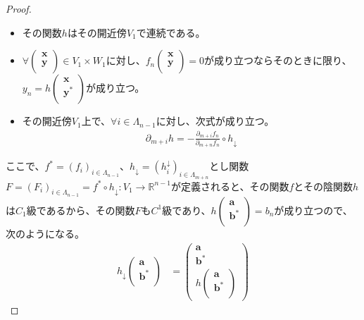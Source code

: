 \documentclass[dvipdfmx]{jsarticle}
\begin{document}
\begin{proof}
\begin{itemize}
\item
  その関数$h$はその開近傍$V_{1}$で連続である。
\item
  $\forall\begin{pmatrix}
  \mathbf{x} \\
  \mathbf{y} \\
  \end{pmatrix} \in V_{1} \times W_{1}$に対し、$f_{n}\begin{pmatrix}
  \mathbf{x} \\
  \mathbf{y} \\
  \end{pmatrix} = 0$が成り立つならそのときに限り、$y_{n} = h\begin{pmatrix}
  \mathbf{x} \\
  \mathbf{y}^{*} \\
  \end{pmatrix}$が成り立つ。
\item
  その開近傍$V_{1}$上で、$\forall i \in \varLambda_{n - 1}$に対し、次式が成り立つ。
\begin{align*}
\partial_{m + i}h = - \frac{\partial_{m + i}f_{n}}{\partial_{m + n}f_{n}} \circ h_{\downarrow}
\end{align*}
\end{itemize}\par
ここで、$f^{*} = \left( f_{i} \right)_{i \in \varLambda_{n - 1}}$、$h_{\downarrow} = \left( h_{i}^{\downarrow} \right)_{i \in \varLambda_{m + n}}$とし関数$F = \left( F_{i} \right)_{i \in \varLambda_{n - 1}} = f^{*} \circ h_{\downarrow}:V_{1} \rightarrow \mathbb{R}^{n - 1}$が定義されると、その関数$f$とその陰関数$h$は$C_{1}$級であるから、その関数$F$も$C^{1}$級であり、$h\begin{pmatrix}
\mathbf{a} \\
\mathbf{b}^{*} \\
\end{pmatrix} = b_{n}$が成り立つので、次のようになる。
\begin{align*}
h_{\downarrow}\begin{pmatrix}
\mathbf{a} \\
\mathbf{b}^{*} \\
\end{pmatrix} &= \begin{pmatrix}
\mathbf{a} \\
\mathbf{b}^{*} \\
h\begin{pmatrix}
\mathbf{a} \\
\mathbf{b}^{*} \\

\end{pmatrix}
\end{pmatrix}
\end{align*}
\end{proof}
\end{document}
